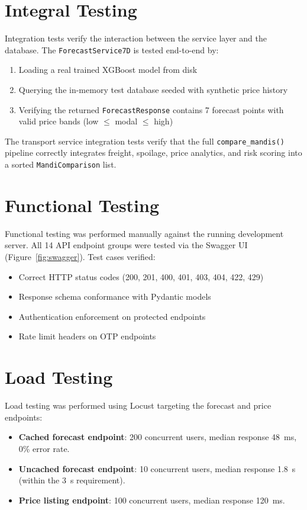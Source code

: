 \documentclass[12pt,a4paper]{report}
\begin{document}
\section{Integral Testing}

Integration tests verify the interaction between the service layer and the database.
The \texttt{ForecastService7D} is tested end-to-end by:
\begin{enumerate}
    \item Loading a real trained XGBoost model from disk
    \item Querying the in-memory test database seeded with synthetic price history
    \item Verifying the returned \texttt{ForecastResponse} contains 7 forecast points
    with valid price bands (low $\leq$ modal $\leq$ high)
\end{enumerate}

The transport service integration tests verify that the full \texttt{compare\_mandis()}
pipeline correctly integrates freight, spoilage, price analytics, and risk scoring into a
sorted \texttt{MandiComparison} list.

\section{Functional Testing}

Functional testing was performed manually against the running development server. All 14
API endpoint groups were tested via the Swagger UI (Figure~\ref{fig:swagger}). Test cases
verified:
\begin{itemize}
    \item Correct HTTP status codes (200, 201, 400, 401, 403, 404, 422, 429)
    \item Response schema conformance with Pydantic models
    \item Authentication enforcement on protected endpoints
    \item Rate limit headers on OTP endpoints
\end{itemize}

\section{Load Testing}

Load testing was performed using Locust targeting the forecast and price endpoints:
\begin{itemize}
    \item \textbf{Cached forecast endpoint}: 200 concurrent users, median response 48~ms,
    0\% error rate.
    \item \textbf{Uncached forecast endpoint}: 10 concurrent users, median response 1.8~s
    (within the 3~s requirement).
    \item \textbf{Price listing endpoint}: 100 concurrent users, median response 120~ms.
\end{itemize}
\end{document}
